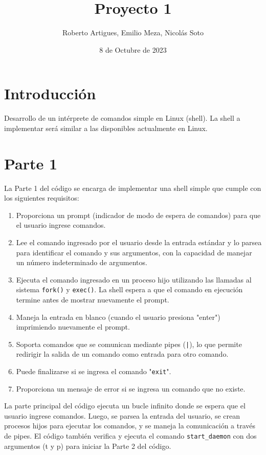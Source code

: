 \documentclass[12pt]{article}
\begin{document}
\title{Proyecto 1}
\author{Roberto Artigues, Emilio Meza, Nicolás Soto}
\date{8 de Octubre de 2023}
\maketitle


\section{Introducción}
Desarrollo de un intérprete de comandos simple en Linux (shell). La shell a implementar será similar
a las disponibles actualmente en Linux.
\section{Parte 1}

La Parte 1 del código se encarga de implementar una shell simple que cumple con los siguientes requisitos:

\begin{enumerate}
\item Proporciona un prompt (indicador de modo de espera de comandos) para que el usuario ingrese comandos.
\item Lee el comando ingresado por el usuario desde la entrada estándar y lo parsea para identificar el comando y sus argumentos, con la capacidad de manejar un número indeterminado de argumentos.
\item Ejecuta el comando ingresado en un proceso hijo utilizando las llamadas al sistema \texttt{fork()} y \texttt{exec()}. La shell espera a que el comando en ejecución termine antes de mostrar nuevamente el prompt.
\item Maneja la entrada en blanco (cuando el usuario presiona "enter") imprimiendo nuevamente el prompt.
\item Soporta comandos que se comunican mediante pipes (\texttt{|}), lo que permite redirigir la salida de un comando como entrada para otro comando.
\item Puede finalizarse si se ingresa el comando "\texttt{exit}".
\item Proporciona un mensaje de error si se ingresa un comando que no existe.
\end{enumerate}

La parte principal del código ejecuta un bucle infinito donde se espera que el usuario ingrese comandos. Luego, se parsea la entrada del usuario, se crean procesos hijos para ejecutar los comandos, y se maneja la comunicación a través de pipes. El código también verifica y ejecuta el comando \texttt{start\_daemon} con dos argumentos (t y p) para iniciar la Parte 2 del código.
\end{document}
